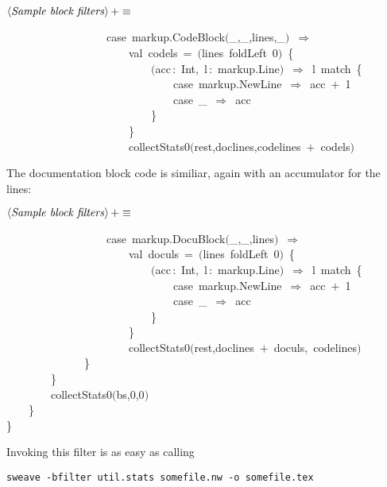 \documentclass[a4paper,12pt]{article}
\begin{document}
$\left<\mbox{\emph{Sample block filters}}\right>+\equiv$
\begin{program}~~~~~~~~~~~~~~~~~~{\vem case}~markup.CodeBlock$($\_,\_,lines,\_$)$~$\Rightarrow$
\\~~~~~~~~~~~~~~~~~~~~~~{\vem val}~codels~=~$($lines~foldLeft~0$)$~{\small\{}
\\~~~~~~~~~~~~~~~~~~~~~~~~~~$($acc\,{\rm :}~Int,~l\,{\rm :}~markup.Line$)$~$\Rightarrow$~l~{\vem match}~{\small\{}
\\~~~~~~~~~~~~~~~~~~~~~~~~~~~~~~{\vem case}~markup.NewLine~$\Rightarrow$~acc~$+$~1
\\~~~~~~~~~~~~~~~~~~~~~~~~~~~~~~{\vem case}~\_~$\Rightarrow$~acc
\\~~~~~~~~~~~~~~~~~~~~~~~~~~{\small\}}
\\~~~~~~~~~~~~~~~~~~~~~~{\small\}}
\\~~~~~~~~~~~~~~~~~~~~~~collectStats0$($rest,doclines,codelines~$+$~codels$)$
\\[0.5em]\end{program}


The documentation block code is similiar, again with an accumulator for
the lines:

$\left<\mbox{\emph{Sample block filters}}\right>+\equiv$
\begin{program}~~~~~~~~~~~~~~~~~~{\vem case}~markup.DocuBlock$($\_,\_,lines$)$~$\Rightarrow$
\\~~~~~~~~~~~~~~~~~~~~~~{\vem val}~doculs~=~$($lines~foldLeft~0$)$~{\small\{}
\\~~~~~~~~~~~~~~~~~~~~~~~~~~$($acc\,{\rm :}~Int,~l\,{\rm :}~markup.Line$)$~$\Rightarrow$~l~{\vem match}~{\small\{}
\\~~~~~~~~~~~~~~~~~~~~~~~~~~~~~~{\vem case}~markup.NewLine~$\Rightarrow$~acc~$+$~1
\\~~~~~~~~~~~~~~~~~~~~~~~~~~~~~~{\vem case}~\_~$\Rightarrow$~acc
\\~~~~~~~~~~~~~~~~~~~~~~~~~~{\small\}}
\\~~~~~~~~~~~~~~~~~~~~~~{\small\}}
\\~~~~~~~~~~~~~~~~~~~~~~collectStats0$($rest,doclines~$+$~doculs,~codelines$)$
\\~~~~~~~~~~~~~~{\small\}}
\\~~~~~~~~{\small\}}
\\~~~~~~~~collectStats0$($bs,0,0$)$
\\~~~~{\small\}}
\\{\small\}}
\\[0.5em]\end{program}


Invoking this filter is as easy as calling

\begin{verbatim}
sweave -bfilter util.stats somefile.nw -o somefile.tex
\end{verbatim}
\end{document}
